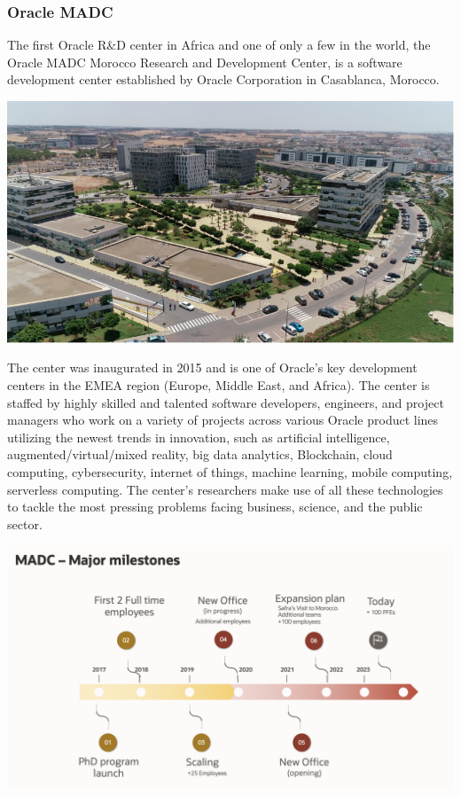 \subsubsection{Oracle MADC}
The first Oracle R\&D center in Africa and one of only a few in the world, the Oracle MADC Morocco Research and Development Center, is a software development center established by Oracle Corporation in Casablanca, Morocco.\mynewline
\begin{center}
    \centering
    \includegraphics[width=\textwidth]{Images/nearshore oracle.png}
    \label{fig:casa}
\end{center}
\noindent
\mynewline
The center was inaugurated in 2015 and is one of Oracle's key development centers in the EMEA region (Europe, Middle East, and Africa). The center is staffed by highly skilled and talented software developers, engineers, and project managers who work on a variety of projects across various Oracle product lines utilizing the newest trends in innovation, such as artificial intelligence, augmented/virtual/mixed reality, big data analytics, Blockchain, cloud computing, cybersecurity, internet of things, machine learning, mobile computing, serverless computing. The center's researchers make use of all these technologies to tackle the most pressing problems facing business, science, and the public sector. \mynewline
\begin{center}
    \centering
    \includegraphics[width=\textwidth]{Images/MADC Major milestones.png}
    \label{fig:madc}
\end{center}
